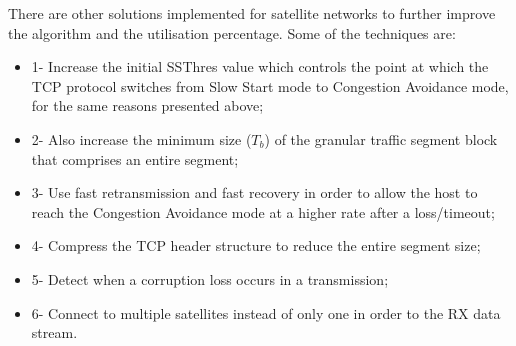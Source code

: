 There are other solutions implemented for satellite networks to further improve the algorithm and the utilisation percentage\autocite{book1_pp269}. Some of the techniques are:

\begin{itemize}
\item 1- Increase the initial SSThres value which controls the point at which the TCP protocol switches from Slow Start mode to Congestion Avoidance mode, for the same reasons presented above;
\item 2- Also increase the minimum size ($T_b$) of the granular traffic segment block that comprises an entire segment;
\item 3- Use fast retransmission and fast recovery in order to allow the host to reach the Congestion Avoidance mode at a higher rate after a loss/timeout;
\item 4- Compress the TCP header structure to reduce the entire segment size\autocite{book2_pp355};
\item 5- Detect when a corruption loss occurs in a transmission;
\item 6- Connect to multiple satellites instead of only one in order to  the RX data stream\autocite{book2_pp355}.
\end{itemize}